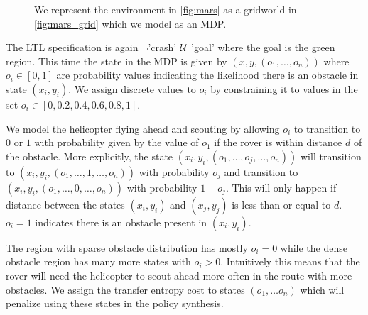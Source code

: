 \begin{figure}
\centering
\begin{minipage}{5.0cm}
\end{minipage}

\begin{minipage}{5.0cm}
\end{minipage}
\caption{We represent the environment in \ref{fig:mars} as a gridworld in \ref{fig:mars_grid} which we model as an MDP. 
	}
\end{figure}

The LTL specification is again $\lnot$'crash' $\operatorname{\mathcal{U}}$ 'goal' where the goal is the green region. This time the state in the MDP is given by $(x,y,(o_1,\dots,o_n))$ where $o_i \in [0,1]$ are probability values indicating the likelihood there is an obstacle in state $(x_i,y_i)$. We assign discrete values to $o_i$ by constraining it to values in the set $o_i \in [0,0.2,0.4,0.6,0.8,1]$. 

We model the helicopter flying ahead and scouting by allowing $o_i$ to transition to $0$ or $1$ with probability given by the value of $o_1$ if the rover is within distance $d$ of the obstacle. More explicitly, the state $(x_i,y_i,(o_1,\dots,o_j,\dots,o_n))$ will transition to $(x_i,y_i,(o_1,\dots,1,\dots,o_n))$ with probability $o_j$ and transition to $(x_i,y_i,(o_1,\dots,0,\dots,o_n))$ with probability $1 - o_j$. This will only happen if distance between the states $(x_i,y_i)$ and $(x_j,y_j)$ is less than or equal to $d$. $o_i = 1$ indicates there is an obstacle present in $(x_i,y_i)$. 

The region with sparse obstacle distribution has mostly $o_i = 0$ while the dense obstacle region has many more states with $o_i > 0$. Intuitively this means that the rover will need the helicopter to scout ahead more often in the route with more obstacles. We assign the transfer entropy cost to states $(o_1,\dots o_n)$ which will penalize using these states in the policy synthesis.

